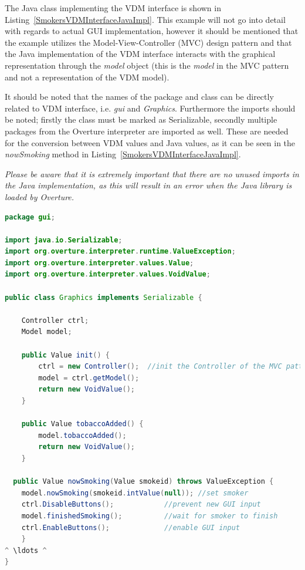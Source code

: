 \documentclass{overturerepchap}
\begin{document}
The Java class implementing the VDM interface is shown in Listing~\ref{SmokersVDMInterfaceJavaImpl}. This example will not go into detail with regards to actual GUI implementation, however it should be mentioned that the example utilizes the Model-View-Controller (MVC) design pattern and that the Java implementation of the VDM interface interacts with the graphical representation through the \textit{model} object (this is the \textit{model} in the MVC pattern and not a representation of the VDM model).

It should be noted that the names of the package and class can be directly related to VDM interface, i.e. \textit{gui} and \textit{Graphics}. Furthermore the imports should be noted; firstly the class must be marked as Serializable, secondly multiple packages from the Overture interpreter are imported as well. These are needed for the conversion between VDM values and Java values, as it can be seen in the \textit{nowSmoking} method in Listing~\ref{SmokersVDMInterfaceJavaImpl}. 

\emph{Please be aware that it is extremely important that there are no unused imports in the Java implementation, as this will result in an error when the Java library is loaded by Overture.} \\
\vspace{1in}
\begin{lstlisting}[language=Java,label=SmokersVDMInterfaceJavaImpl,caption=Java implementation of the VDM interface for the external Java library,captionpos=b]
package gui;

import java.io.Serializable;
import org.overture.interpreter.runtime.ValueException;
import org.overture.interpreter.values.Value;
import org.overture.interpreter.values.VoidValue;

public class Graphics implements Serializable {

    Controller ctrl;
    Model model;

    public Value init() {
    	ctrl = new Controller();  //init the Controller of the MVC pattern
    	model = ctrl.getModel();
        return new VoidValue();
    }

    public Value tobaccoAdded() {
        model.tobaccoAdded();
        return new VoidValue();
    }

  public Value nowSmoking(Value smokeid) throws ValueException {
	model.nowSmoking(smokeid.intValue(null)); //set smoker
	ctrl.DisableButtons(); 			  //prevent new GUI input
	model.finishedSmoking(); 		  //wait for smoker to finish
	ctrl.EnableButtons(); 			  //enable GUI input
    }
^ \ldots ^
}
\end{lstlisting}
\end{document}
